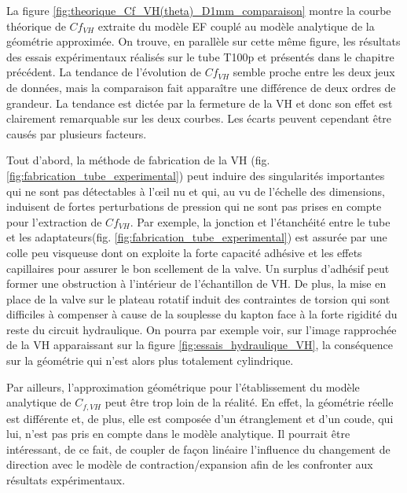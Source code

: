 La figure \ref{fig:theorique_Cf_VH(theta)_D1mm_comparaison} montre la courbe théorique de $Cf_{VH}$ extraite du modèle EF couplé au modèle analytique de la géométrie approximée. On trouve, en parallèle sur cette même figure, les résultats des essais expérimentaux réalisés sur le tube T100p et présentés dans le chapitre précédent. La tendance de l'évolution de $Cf_{VH}$ semble proche entre les deux jeux de données, mais la comparaison fait apparaître une différence de deux ordres de grandeur. La tendance est dictée par la fermeture de la VH et donc son effet est clairement remarquable sur les deux courbes. Les écarts peuvent cependant être causés par plusieurs facteurs.

Tout d'abord, la méthode de fabrication de la VH (fig. \ref{fig:fabrication_tube_experimental}) peut induire des singularités importantes qui ne sont pas détectables à l'\oe{}il nu et qui, au vu de l'échelle des dimensions, induisent de fortes perturbations de pression qui ne sont pas prises en compte pour l'extraction de $Cf_{VH}$. Par exemple, la jonction et l'étanchéité entre le tube et les adaptateurs(fig. \ref{fig:fabrication_tube_experimental}) est assurée par une colle peu visqueuse dont on exploite la forte capacité adhésive et les effets capillaires pour assurer le bon scellement de la valve. Un surplus d'adhésif peut former une obstruction à l'intérieur de l'échantillon de VH. De plus, la mise en place de la valve sur le plateau rotatif induit des contraintes de torsion qui sont difficiles à compenser à cause de la souplesse du kapton face à la forte rigidité du reste du circuit hydraulique. On pourra par exemple voir, sur l'image rapprochée de la VH apparaissant sur la figure \ref{fig:essais_hydraulique_VH}, la conséquence sur la géométrie qui n'est alors plus totalement cylindrique.

Par ailleurs, l'approximation géométrique pour l'établissement du modèle analytique de $C_{f,VH}$ peut être trop loin de la réalité. En effet, la géométrie réelle est différente et, de plus, elle est composée d'un étranglement et d'un coude, qui lui, n'est pas pris en compte dans le modèle analytique. Il pourrait être intéressant, de ce fait, de coupler de façon linéaire l'influence du changement de direction avec le modèle de contraction/expansion afin de les confronter aux résultats expérimentaux.

